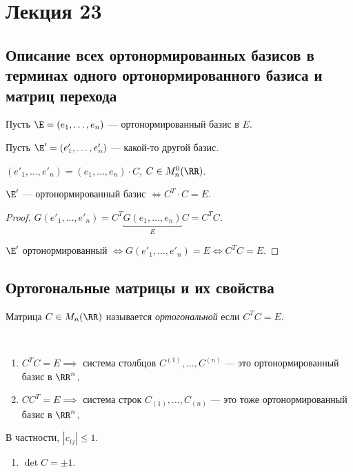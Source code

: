 \section{Лекция 23}


\subsection{Описание всех ортонормированных базисов в терминах одного ортонормированного базиса и матриц перехода}

Пусть $\E = (e_1, \dots, e_n)$ --- ортонормированный базис в $E$.

Пусть $\E' = (e'_1, \dots, e'_n)$ --- какой-то другой базис.

$(e'_1, \dots, e'_n) = (e_1, \dots, e_n) \cdot C$, $C \in M_n^{0}(\RR)$.

\begin{proposal}
    $\E'$ --- ортонормированный базис $\iff C^{T} \cdot C = E$.
\end{proposal}

\begin{proof}
    $G(e'_1, \dots, e'_n) = C^{T} \underbracket{G(e_1, \dots, e_n)}_E C = C^{T} C$.

    $\E'$ ортонормированный $\iff G(e'_1, \dots, e'_n) = E \iff C^{T} C = E$.
\end{proof}


\subsection{Ортогональные матрицы и их свойства}

\begin{definition}
    Матрица $C \in M_n(\RR)$ называется \textit{ортогональной} если $C^{T} C = E$.
\end{definition}

\begin{comment}
    $C^{T} C = E \iff C C^{T} = E \iff C^{-1} = C^{T}$.
\end{comment}

\begin{properties}~
    \begin{enumerate}
    \item $C^{T} C = E \implies $ система столбцов $C^{(1)}, \dots, C^{(n)}$ --- это ортонормированный базис в $\RR^n$,
    \item $C C^{T} = E \implies $ система строк $C_{(1)}, \dots, C_{(n)}$ --- это тоже ортонормированный базис в $\RR^n$,
    \end{enumerate}
    В частности, $|c_{ij}| \leq 1$.
    \begin{enumerate}[resume]
    \item $\det C = \pm 1$.
    \end{enumerate}
\end{properties}

